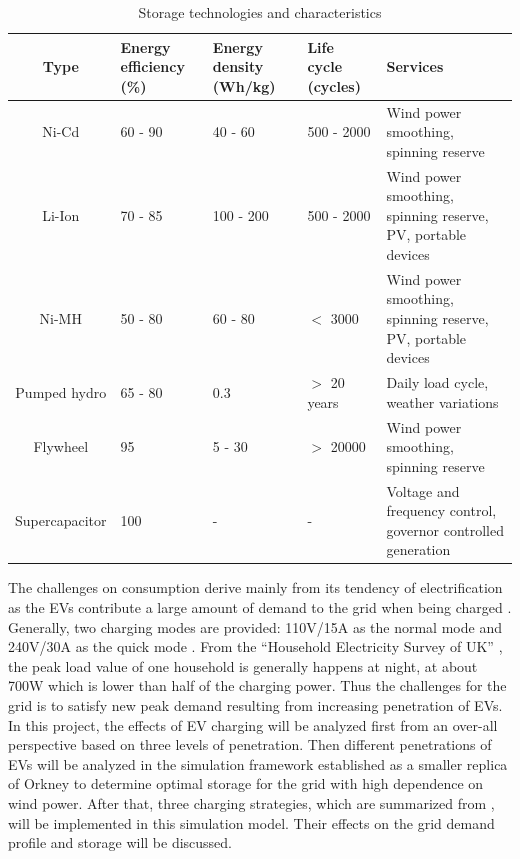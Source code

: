 \documentclass[12pt,a4paper]{report}
\begin{document}
        \begin{table}[ht]
            \begin{tabulary}{\linewidth}{c L L L L}
                \hline
                Type & Energy efficiency (\%) & Energy density (Wh/kg) & Life cycle (cycles) & Services \\ \hline
                \hline
                Ni-Cd & 60 - 90 & 40 - 60 & 500 - 2000 & Wind power smoothing, spinning reserve \\ \hline
                Li-Ion & 70 - 85 & 100 - 200 & 500 - 2000 &  Wind power smoothing, spinning reserve, PV, portable devices\\ \hline
                Ni-MH & 50 - 80 & 60 - 80 & $<$ 3000 & Wind power smoothing, spinning reserve, PV, portable devices \\ \hline
                Pumped hydro & 65 - 80 & 0.3 & $>$ 20 years & Daily load cycle, weather variations \\ \hline
                Flywheel & 95 & 5 - 30 & $>$ 20000 &  Wind power smoothing, spinning reserve \\ \hline
                Supercapacitor & 100 & - & - & Voltage and frequency control, governor controlled generation \\ \hline
            \end{tabulary}
            \caption{Storage technologies and characteristics}
            \label{table_storage_characteristics}
        \end{table}
        
        The challenges on consumption derive mainly from its tendency of electrification as the EVs contribute a large amount of demand to the grid when being charged \cite{paper:PieltainFernandez2011}. 
        Generally, two charging modes are provided: 110V/15A as the normal mode and 240V/30A as the quick mode \cite{paper:Shao2010}. 
        From the ``Household Electricity Survey of UK'' \cite{report:household}, the peak load value of one household is generally happens at night, at about 700W which is lower than half of the charging power.
        Thus the challenges for the grid is to satisfy new peak demand resulting from increasing penetration of EVs.
        In this project, the effects of EV charging will be analyzed first from an over-all perspective based on three levels of penetration.
        Then different penetrations of EVs will be analyzed in the simulation framework established as a smaller replica of Orkney to determine optimal storage for the grid with high dependence on wind power. 
        After that, three charging strategies, which are summarized from \cite{paper:Qian2011}, will be implemented in this simulation model. Their effects on the grid demand profile and storage will be discussed.
\end{document}
